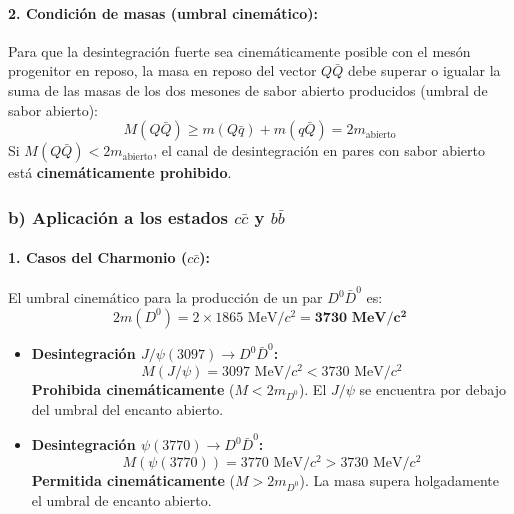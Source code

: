\begin{problema}
\paragraph{2. Condición de masas (umbral cinemático):}
Para que la desintegración fuerte sea cinemáticamente posible con el mesón progenitor en reposo, la masa en reposo del vector $Q\bar{Q}$ debe superar o igualar la suma de las masas de los dos mesones de sabor abierto producidos (umbral de sabor abierto):
\begin{equation*}
M(Q\bar{Q}) \ge m(Q\bar{q}) + m(q\bar{Q}) = 2 m_{\text{abierto}}
\end{equation*}
Si $M(Q\bar{Q}) < 2 m_{\text{abierto}}$, el canal de desintegración en pares con sabor abierto está \textbf{cinemáticamente prohibido}.

\subsubsection*{b) Aplicación a los estados $c\bar{c}$ y $b\bar{b}$}

\paragraph{1. Casos del Charmonio ($c\bar{c}$):}
El umbral cinemático para la producción de un par $D^0 \bar{D}^0$ es:
\begin{equation*}
2 m(D^0) = 2 \times 1865\text{ MeV}/c^2 = \mathbf{3730\text{ MeV}/c^2}
\end{equation*}

\begin{itemize}
    \item \textbf{Desintegración $J/\psi(3097) \to D^0 \bar{D}^0$:}
    \begin{equation*}
    M(J/\psi) = 3097\text{ MeV}/c^2 < 3730\text{ MeV}/c^2
    \end{equation*}
    \textbf{Prohibida cinemáticamente} ($M < 2 m_{D^0}$). El $J/\psi$ se encuentra por debajo del umbral del encanto abierto.

    \item \textbf{Desintegración $\psi(3770) \to D^0 \bar{D}^0$:}
    \begin{equation*}
    M(\psi(3770)) = 3770\text{ MeV}/c^2 > 3730\text{ MeV}/c^2
    \end{equation*}
    \textbf{Permitida cinemáticamente} ($M > 2 m_{D^0}$). La masa supera holgadamente el umbral de encanto abierto.
\end{itemize}


\end{problema}
